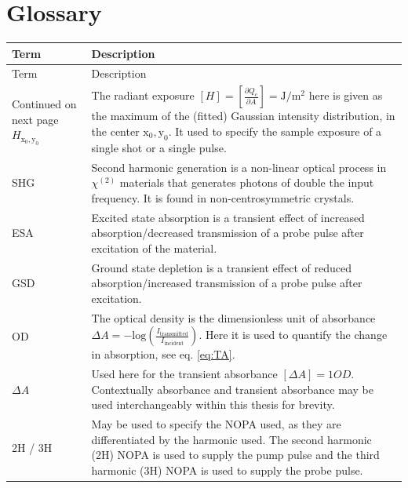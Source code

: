 \documentclass[twoside,openright,listof=numbered]{scrreprt}
\def\radiantExp{\ensuremath{H_\mathrm{x_0,y_0}}}
\begin{document}


\chapter{Glossary}

\begin{longtable}{p{}p{}}
    \toprule 
    Term & Description \\
    \midrule
    \endfirsthead
    \toprule 
    Term & Description \\
    \midrule
    \endhead
    \midrule
    Continued on next page
    \endfoot
    \bottomrule
    \endlastfoot
\radiantExp & The radiant exposure $[H] = [\frac{\partial Q_e}{\partial A}] = \si{\joule\per\square\meter}$ here is given as the maximum of the (fitted) Gaussian intensity distribution, in the center $\mathrm{x_0,y_0}$. It used to specify the sample exposure of a single shot or a single pulse. \\
SHG & Second harmonic generation is a non-linear optical process in $\chi^{\left(2\right)}$ materials that generates photons of double the input frequency. It is found in non-centrosymmetric crystals.\\
ESA & Excited state absorption is a transient effect of increased absorption/decreased transmission of a probe pulse after excitation of the material.\\
GSD & Ground state depletion is a transient effect of reduced absorption/increased transmission of a probe pulse after excitation.\\
OD & The optical density is the dimensionless unit of absorbance $\Delta A = -\text{log}\left(\frac{I_\text{transmitted}}{I_\text{incident}}\right)$. Here it is used to quantify the change in absorption, see eq. \ref{eq:TA}.\\
$\Delta A$& Used here for the transient absorbance $[\Delta A] = 1 OD$. Contextually absorbance and transient absorbance may be used interchangeably within this thesis for brevity.\\
2H / 3H & May be used to specify the NOPA used, as they are differentiated by the harmonic used. The second harmonic (2H) NOPA is used to supply the pump pulse and the third harmonic (3H) NOPA is used to supply the probe pulse.\\
\bottomrule
\end{longtable}
\end{document}
